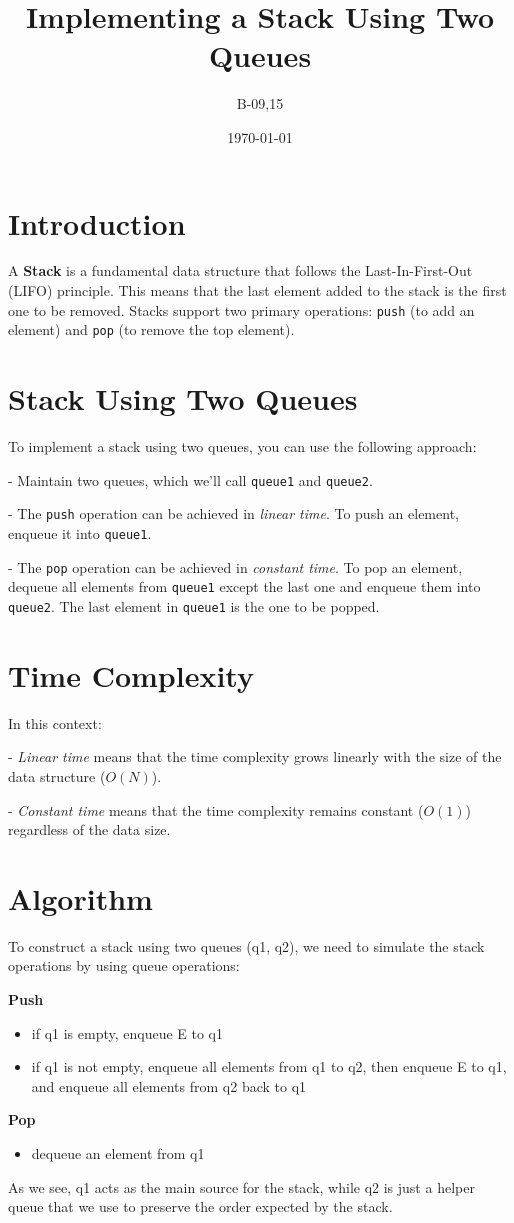 \documentclass{article}
\title{Implementing a Stack Using Two Queues}
\author{B-09,15}
\date{\today}
\begin{document}
\maketitle

\section{Introduction}
A \textbf{Stack} is a fundamental data structure that follows the Last-In-First-Out (LIFO) principle. This means that the last element added to the stack is the first one to be removed. Stacks support two primary operations: \texttt{push} (to add an element) and \texttt{pop} (to remove the top element).

\section{Stack Using Two Queues}
To implement a stack using two queues, you can use the following approach:

- Maintain two queues, which we'll call \texttt{queue1} and \texttt{queue2}.

- The \texttt{push} operation can be achieved in \textit{linear time}. To push an element, enqueue it into \texttt{queue1}.

- The \texttt{pop} operation can be achieved in \textit{constant time}. To pop an element, dequeue all elements from \texttt{queue1} except the last one and enqueue them into \texttt{queue2}. The last element in \texttt{queue1} is the one to be popped.

\section{Time Complexity}
In this context:

- \textit{Linear time} means that the time complexity grows linearly with the size of the data structure (\(O(N)\)).

- \textit{Constant time} means that the time complexity remains constant (\(O(1)\)) regardless of the data size.

\section{Algorithm}
To construct a stack using two queues (q1, q2), we need to simulate the stack operations by using queue operations:

\textbf{Push}
\begin{itemize}
    \item if q1 is empty, enqueue E to q1
\end{itemize}
\begin{itemize}
    \item if q1 is not empty, enqueue all elements from q1 to q2, then enqueue E to q1, and enqueue all elements from q2 back to q1
\end{itemize}
\textbf{Pop}
\begin{itemize}
    \item dequeue an element from q1
\end{itemize}
As we see, q1 acts as the main source for the stack, while q2 is just a helper queue that we use to preserve the order expected by the stack.
\end{document}
